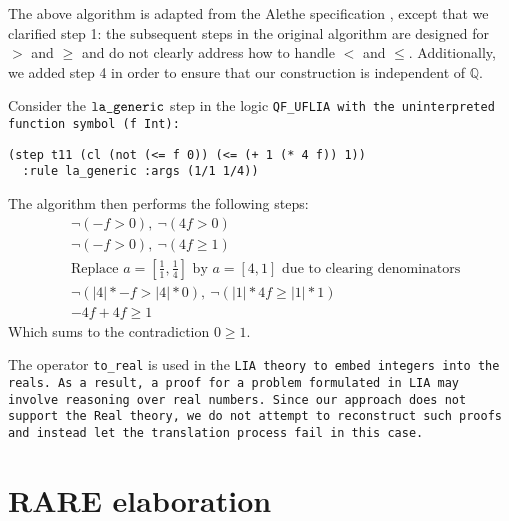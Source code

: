 The above algorithm is adapted from the Alethe specification \cite{alethespec}, except that we clarified step 1: the subsequent steps in the original algorithm are designed for $>$ and $\geq$ and do not clearly address how to handle $<$ and $\leq$.
Additionally, we added step 4 in order to ensure that our construction is independent of $\mathbb{Q}$.

\begin{example}
Consider the $\tt{la\_generic}$ step in the logic \tt{QF\_UFLIA} with the uninterpreted function symbol \lstinline[language=SMT,basicstyle=\ttfamily\upshape]|(f Int)|:
\begin{lstlisting}[language=SMT,label={lst:lageneric-example}]
(step t11 (cl (not (<= f 0)) (<= (+ 1 (* 4 f)) 1))
  :rule la_generic :args (1/1 1/4))
\end{lstlisting}
%
The algorithm then performs the following steps:
\begin{align}
&\neg (- f > 0),~ \neg(4f > 0) \label{eq:step2}\tag{Steps 1 and 2}\\
&\neg (- f > 0),~ \neg(4f \geq 1) \label{eq:step3}\tag{Step 3}\\
&\text{Replace } a = [\frac{1}{1}, \frac{1}{4}] \text{ by } a = [4, 1] \text{ due to clearing denominators} \label{eq:step4}\tag{Step 4}\\
&\neg (|4| * - f > |4| * 0 ), ~ \neg(|1| * 4f \geq |1| * 1) \label{eq:step5}\tag{Step 5} \\
&-4f + 4f \geq 1 \label{eq:step6}\tag{Step 6}
\end{align}
Which sums to the contradiction  $0 \geq 1$.
\label{ex:la_generic_example_red}
\end{example}

\begin{remark}
The operator \lstinline[language=SMT,basicstyle=\ttfamily\footnotesize]{to_real} is used in the \tt{LIA} theory to embed integers into the reals.
As a result, a proof for a problem formulated in \tt{LIA} may involve reasoning over real numbers.
Since our approach does not support the \lstinline[language=SMT,basicstyle=\ttfamily\footnotesize\upshape]{Real} theory, we do not attempt to reconstruct such proofs and instead let the translation process fail in this case.
\end{remark}



\section{RARE elaboration}
\label{sec:rare-intro}

